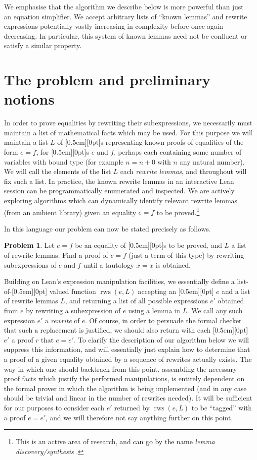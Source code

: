 \documentclass[a4paper]{article}
\DeclareMathOperator{\rws}{rws}
\theoremstyle{plain}
\theoremstyle{definition}
\newtheorem{prob}[theorem]{Problem}
\newcommand{\xx}[1]{{\colorbox{gray!15}{\raisebox{0em}[0.5em][0pt]{\makebox[\width-0.4em]{\texttt{#1}}}}}}
\newcommand{\expr}{\xx{expr}}
\begin{document}
We emphasise that the algorithm we describe below is more powerful than just an equation simplifier. We accept arbitrary lists of ``known lemmas'' and rewrite expressions potentially vastly increasing in complexity before once again decreasing. In particular, this system of known lemmas need not be confluent or satisfy a similar property.

\section{The problem and preliminary notions}

In order to prove equalities by rewriting their subexpressions, we necessarily must maintain a list of mathematical facts which may be used. For this purpose we will maintain a list $L$ of \xx{expr}s representing known proofs of equalities of the form $e = f$, for \expr{}s $e$ and $f$, perhaps each containing some number of variables with bound type (for example $n = n + 0$ with $n$ any natural number). We will call the elements of the list $L$ each \textit{rewrite lemmas}, and throughout will fix such a list. In practice, the known rewrite lemmas in an interactive Lean session can be programmatically enumerated and inspected. We are actively exploring algorithms which can dynamically identify relevant rewrite lemmas (from an ambient library) given an equality $e = f$ to be proved.\footnote{This is an active area of research, and can go by the name \textit{lemma discovery/synthesis} \cite{heras2013proof}.}

In this language our problem can now be stated precisely as follows.

\begin{prob}
  Let $e = f$ be an equality of \expr{}s to be proved, and $L$ a list of rewrite lemmas. Find a proof of $e = f$ (just a term of this type) by rewriting subexpressions of $e$ and $f$ until a tautology $x = x$ is obtained.
\end{prob}

Building on Lean's expression manipulation facilities, we essentially define a list-of-\expr{} valued function $\rws(e, L)$ accepting an \xx{expr} $e$ and a list of rewrite lemmas $L$, and returning a list of all possible expressions $e'$ obtained from $e$ by rewriting a subexpression of $e$ using a lemma in $L$. We call any such expression $e'$ a \textit{rewrite} of $e$. Of course, in order to persuade the formal checker that such a replacement is justified, we should also return with each \expr{} $e'$ a proof $r$ that $e = e'$. To clarify the description of our algorithm below we will suppress this information, and will essentially just explain how to determine that a proof of a given equality obtained by a sequence of rewrites actually exists. The way in which one should backtrack from this point, assembling the necessary proof facts which justify the performed manipulations, is entirely dependent on the formal prover in which the algorithm is being implemented (and in any case should be trivial and linear in the number of rewrites needed). It will be sufficient for our purposes to consider each $e'$ returned by $\rws(e, L)$ to be ``tagged'' with a proof $e = e'$, and we will therefore not say anything further on this point.
\end{document}
